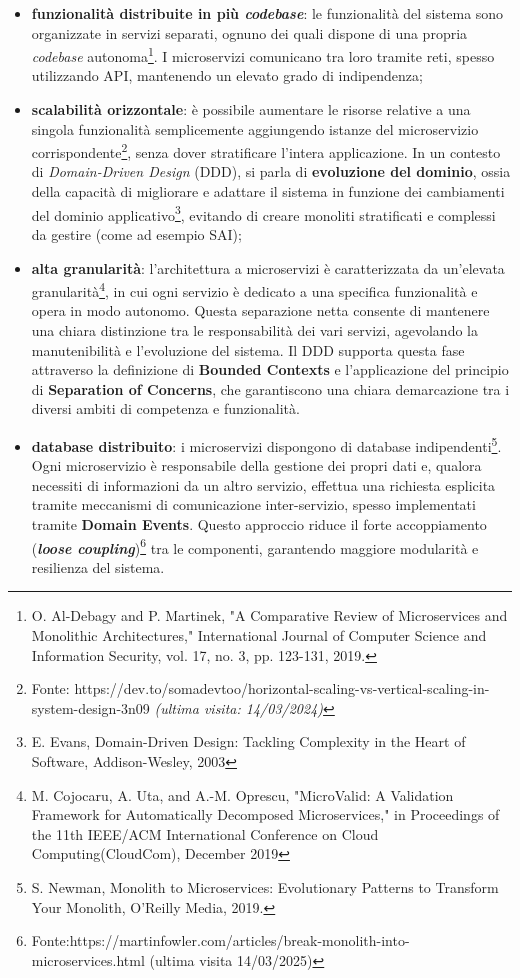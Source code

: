             \begin{itemize}
                \item \textbf{funzionalità distribuite in più \textit{codebase}}: le funzionalità del sistema sono organizzate in servizi separati, ognuno dei quali dispone di una propria \textit{codebase} autonoma\footnote{O. Al-Debagy and P. Martinek, "A Comparative Review of Microservices and Monolithic Architectures," International Journal of Computer Science and Information Security, vol. 17, no. 3, pp. 123-131, 2019.}. I microservizi comunicano tra loro tramite reti, spesso utilizzando API, mantenendo un elevato grado di indipendenza;
                \item \textbf{scalabilità orizzontale}: è possibile aumentare le risorse relative a una singola funzionalità semplicemente aggiungendo istanze del microservizio corrispondente\footnote{Fonte: https://dev.to/somadevtoo/horizontal-scaling-vs-vertical-scaling-in-system-design-3n09 \textit{(ultima visita: 14/03/2024)}}, senza dover stratificare l’intera applicazione. In un contesto di \textit{Domain-Driven Design} (DDD), si parla di \textbf{evoluzione del dominio}, ossia della capacità di migliorare e adattare il sistema in funzione dei cambiamenti del dominio applicativo\footnote{E. Evans, Domain-Driven Design: Tackling Complexity in the Heart of Software, Addison-Wesley, 2003}, evitando di creare monoliti stratificati e complessi da gestire (come ad esempio SAI);
                \item \textbf{alta granularità}: l’architettura a microservizi è caratterizzata da un’elevata granularità\footnote{M. Cojocaru, A. Uta, and A.-M. Oprescu, "MicroValid: A Validation Framework for Automatically Decomposed Microservices," in Proceedings of the 11th IEEE/ACM International Conference on Cloud Computing(CloudCom), December 2019}, in cui ogni servizio è dedicato a una specifica funzionalità e opera in modo autonomo. Questa separazione netta consente di mantenere una chiara distinzione tra le responsabilità dei vari servizi, agevolando la manutenibilità e l’evoluzione del sistema. Il DDD supporta questa fase attraverso la definizione di \textbf{Bounded Contexts} e l’applicazione del principio di \textbf{Separation of Concerns}, che garantiscono una chiara demarcazione tra i diversi ambiti di competenza e funzionalità.  
                \item \textbf{database distribuito}: i microservizi dispongono di database indipendenti\footnote{S. Newman, Monolith to Microservices: Evolutionary Patterns to Transform Your Monolith, O'Reilly Media, 2019.}. Ogni microservizio è responsabile della gestione dei propri dati e, qualora necessiti di informazioni da un altro servizio, effettua una richiesta esplicita tramite meccanismi di comunicazione inter-servizio, spesso implementati tramite \textbf{Domain Events}. Questo approccio riduce il forte accoppiamento (\textbf{\textit{loose coupling}})\footnote{Fonte:https://martinfowler.com/articles/break-monolith-into-microservices.html (ultima visita 14/03/2025)} tra le componenti, garantendo maggiore modularità e resilienza del sistema. 
            \end{itemize}  

